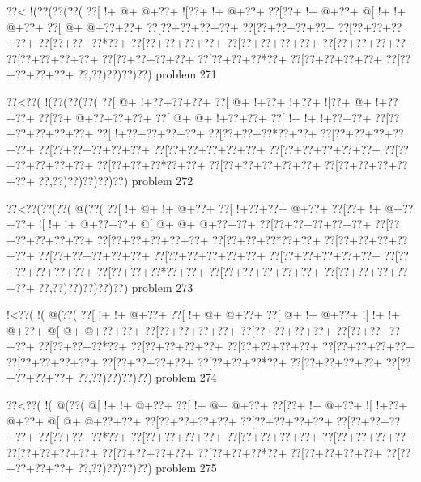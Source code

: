 \vbox{\vbox{\goo
\0??<\- !(\0??(\0??(\0??(
\0??[\- !+\- @+\- @+\0??+
\- ![\0??+\- !+\- @+\0??+
\0??[\0??+\- !+\- @+\0??+
\- @[\- !+\- !+\- @+\0??+
\0??[\- @+\- @+\0??+\0??+
\0??[\0??+\0??+\0??+\0??+
\0??[\0??+\0??+\0??+\0??+
\0??[\0??+\0??+\0??+\0??+
\0??[\0??+\0??+\0??*\0??+
\0??[\0??+\0??+\0??+\0??+
\0??[\0??+\0??+\0??+\0??+
\0??[\0??+\0??+\0??+\0??+
\0??[\0??+\0??+\0??+\0??+
\0??[\0??+\0??+\0??+\0??+
\0??[\0??+\0??+\0??*\0??+
\0??[\0??+\0??+\0??+\0??+
\0??[\0??+\0??+\0??+\0??+
\0??,\0??)\0??)\0??)\0??)
}
\hfil problem 271\hfil\break
}

\vbox{\vbox{\goo
\0??<\0??(\- !(\0??(\0??(\0??(
\0??[\- @+\- !+\0??+\0??+\0??+
\0??[\- @+\- !+\0??+\- !+\0??+
\- ![\0??+\- @+\- !+\0??+\0??+
\0??[\0??+\- @+\0??+\0??+\0??+
\0??[\- @+\- @+\- !+\0??+\0??+
\0??[\- !+\- !+\- !+\0??+\0??+
\0??[\0??+\0??+\0??+\0??+\0??+
\0??[\- !+\0??+\0??+\0??+\0??+
\0??[\0??+\0??+\0??*\0??+\0??+
\0??[\0??+\0??+\0??+\0??+\0??+
\0??[\0??+\0??+\0??+\0??+\0??+
\0??[\0??+\0??+\0??+\0??+\0??+
\0??[\0??+\0??+\0??+\0??+\0??+
\0??[\0??+\0??+\0??+\0??+\0??+
\0??[\0??+\0??+\0??*\0??+\0??+
\0??[\0??+\0??+\0??+\0??+\0??+
\0??[\0??+\0??+\0??+\0??+\0??+
\0??,\0??)\0??)\0??)\0??)\0??)
}
\hfil problem 272\hfil\break
}

\vbox{\vbox{\goo
\0??<\0??(\0??(\0??(\- @(\0??(
\0??[\- !+\- @+\- !+\- @+\0??+
\0??[\- !+\0??+\0??+\- @+\0??+
\0??[\0??+\- !+\- @+\0??+\0??+
\- ![\- !+\- !+\- @+\0??+\0??+
\- @[\- @+\- @+\- @+\0??+\0??+
\0??[\0??+\0??+\0??+\0??+\0??+
\0??[\0??+\0??+\0??+\0??+\0??+
\0??[\0??+\0??+\0??+\0??+\0??+
\0??[\0??+\0??+\0??*\0??+\0??+
\0??[\0??+\0??+\0??+\0??+\0??+
\0??[\0??+\0??+\0??+\0??+\0??+
\0??[\0??+\0??+\0??+\0??+\0??+
\0??[\0??+\0??+\0??+\0??+\0??+
\0??[\0??+\0??+\0??+\0??+\0??+
\0??[\0??+\0??+\0??*\0??+\0??+
\0??[\0??+\0??+\0??+\0??+\0??+
\0??[\0??+\0??+\0??+\0??+\0??+
\0??,\0??)\0??)\0??)\0??)\0??)
}
\hfil problem 273\hfil\break
}

\vbox{\vbox{\goo
\- !<\0??(\- !(\- @(\0??(
\0??[\- !+\- !+\- @+\0??+
\0??[\- !+\- @+\- @+\0??+
\0??[\- @+\- !+\- @+\0??+
\- ![\- !+\- !+\- @+\0??+
\- @[\- @+\- @+\0??+\0??+
\0??[\0??+\0??+\0??+\0??+
\0??[\0??+\0??+\0??+\0??+
\0??[\0??+\0??+\0??+\0??+
\0??[\0??+\0??+\0??*\0??+
\0??[\0??+\0??+\0??+\0??+
\0??[\0??+\0??+\0??+\0??+
\0??[\0??+\0??+\0??+\0??+
\0??[\0??+\0??+\0??+\0??+
\0??[\0??+\0??+\0??+\0??+
\0??[\0??+\0??+\0??*\0??+
\0??[\0??+\0??+\0??+\0??+
\0??[\0??+\0??+\0??+\0??+
\0??,\0??)\0??)\0??)\0??)
}
\hfil problem 274\hfil\break
}

\vbox{\vbox{\goo
\0??<\0??(\- !(\- @(\0??(
\- @[\- !+\- !+\- @+\0??+
\0??[\- !+\- @+\- @+\0??+
\0??[\0??+\- !+\- @+\0??+
\- ![\- !+\0??+\- @+\0??+
\- @[\- @+\- @+\0??+\0??+
\0??[\0??+\0??+\0??+\0??+
\0??[\0??+\0??+\0??+\0??+
\0??[\0??+\0??+\0??+\0??+
\0??[\0??+\0??+\0??*\0??+
\0??[\0??+\0??+\0??+\0??+
\0??[\0??+\0??+\0??+\0??+
\0??[\0??+\0??+\0??+\0??+
\0??[\0??+\0??+\0??+\0??+
\0??[\0??+\0??+\0??+\0??+
\0??[\0??+\0??+\0??*\0??+
\0??[\0??+\0??+\0??+\0??+
\0??[\0??+\0??+\0??+\0??+
\0??,\0??)\0??)\0??)\0??)
}
\hfil problem 275\hfil\break
}

